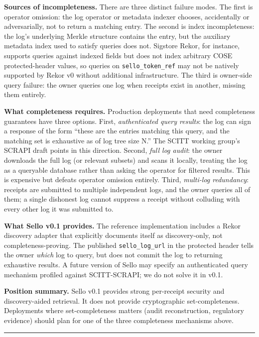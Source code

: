 \documentclass[
  11pt,
]{article}
\begin{document}
\textbf{Sources of incompleteness.} There are three distinct failure
modes. The first is operator omission: the log operator or metadata
indexer chooses, accidentally or adversarially, not to return a matching
entry. The second is index incompleteness: the log's underlying Merkle
structure contains the entry, but the auxiliary metadata index used to
satisfy queries does not. Sigstore Rekor, for instance, supports queries
against indexed fields but does not index arbitrary COSE
protected-header values, so queries on \texttt{sello\_token\_ref} may
not be natively supported by Rekor v0 without additional infrastructure.
The third is owner-side query failure: the owner queries one log when
receipts exist in another, missing them entirely.

\textbf{What completeness requires.} Production deployments that need
completeness guarantees have three options. First, \emph{authenticated
query results}: the log can sign a response of the form ``these are the
entries matching this query, and the matching set is exhaustive as of
log tree size N.'' The SCITT working group's SCRAPI draft
\citep{scitt-scrapi} points in this direction. Second, \emph{full log
audit}: the owner downloads the full log (or relevant subsets) and scans
it locally, treating the log as a queryable database rather than asking
the operator for filtered results. This is expensive but defeats
operator omission entirely. Third, \emph{multi-log redundancy}: receipts
are submitted to multiple independent logs, and the owner queries all of
them; a single dishonest log cannot suppress a receipt without colluding
with every other log it was submitted to.

\textbf{What Sello v0.1 provides.} The reference implementation includes
a Rekor discovery adapter that explicitly documents itself as
discovery-only, not completeness-proving. The published
\texttt{sello\_log\_url} in the protected header tells the owner
\emph{which} log to query, but does not commit the log to returning
exhaustive results. A future version of Sello may specify an
authenticated query mechanism profiled against SCITT-SCRAPI; we do not
solve it in v0.1.

\textbf{Position summary.} Sello v0.1 provides strong per-receipt
security and discovery-aided retrieval. It does not provide
cryptographic set-completeness. Deployments where set-completeness
matters (audit reconstruction, regulatory evidence) should plan for one
of the three completeness mechanisms above.

\begin{center}\rule{0.5\linewidth}{0.5pt}\end{center}
\end{document}
